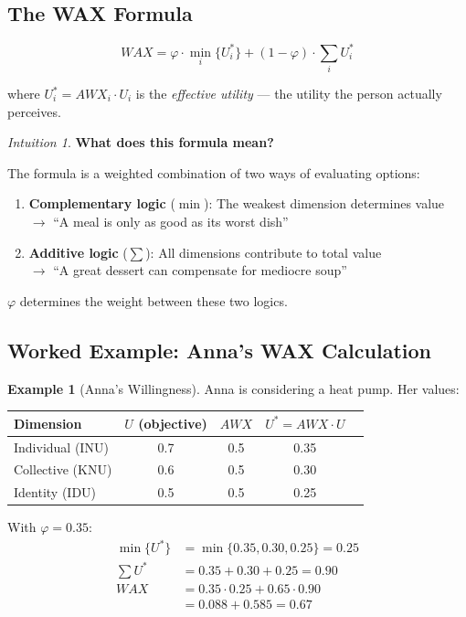\documentclass[11pt,a4paper]{book}
\theoremstyle{definition}
\newtheorem{example}{Example}[section]
\theoremstyle{remark}
\newtheorem*{intuition}{Intuition}
\begin{document}
\subsection{The WAX Formula}

\begin{equation}
\boxed{WAX = \varphi \cdot \min_i\{U_i^*\} + (1-\varphi) \cdot \sum_i U_i^*}
\end{equation}

where $U_i^* = AWX_i \cdot U_i$ is the \textit{effective utility} — the utility the person actually perceives.

\begin{intuition}
\textbf{What does this formula mean?}

The formula is a weighted combination of two ways of evaluating options:

\begin{enumerate}
\item \textbf{Complementary logic} ($\min$): The weakest dimension determines value\\
$\rightarrow$ ``A meal is only as good as its worst dish''

\item \textbf{Additive logic} ($\sum$): All dimensions contribute to total value\\
$\rightarrow$ ``A great dessert can compensate for mediocre soup''
\end{enumerate}

$\varphi$ determines the weight between these two logics.
\end{intuition}

\subsection{Worked Example: Anna's WAX Calculation}

\begin{example}[Anna's Willingness]
Anna is considering a heat pump. Her values:

\begin{center}
\begin{tabular}{lcccc}
\toprule
\textbf{Dimension} & $U$ (objective) & $AWX$ & $U^* = AWX \cdot U$ \\
\midrule
Individual (INU) & 0.7 & 0.5 & 0.35 \\
Collective (KNU) & 0.6 & 0.5 & 0.30 \\
Identity (IDU) & 0.5 & 0.5 & 0.25 \\
\bottomrule
\end{tabular}
\end{center}

With $\varphi = 0.35$:
\begin{align*}
\min\{U^*\} &= \min\{0.35, 0.30, 0.25\} = 0.25\\
\sum U^* &= 0.35 + 0.30 + 0.25 = 0.90\\
WAX &= 0.35 \cdot 0.25 + 0.65 \cdot 0.90\\
&= 0.088 + 0.585 = \mathbf{0.67}
\end{align*}
\end{example}
\end{document}
